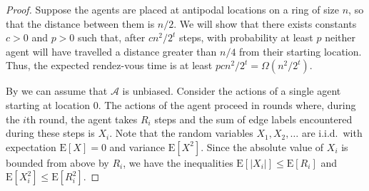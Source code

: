 \documentclass[lotsofwhite]{patmorin}
\newcommand{\E}{\mathrm{E}}
\newcommand{\A}{\mathcal{A}}
\begin{document}
\begin{proof}
Suppose the agents are placed at antipodal locations on a ring of size
$n$,
so that the distance between them is $n/2$.  We will show that there
exists constants $c >0$ and $p> 0$ such that, after $cn^2/2^t$ steps,
with probability at least $p$ neither agent will have travelled a
distance greater than $n/4$ from their starting location.  Thus, the
expected rendez-vous time is at least $p cn^2/2^t = \Omega(n^2/2^t)$.

By  we can assume that $\A$ is unbiased.
Consider the actions of a single agent starting at location 0.  The
actions of the agent proceed in rounds where, during the $i$th round,
the agent takes $R_i$ steps and the sum of edge labels encountered
during these steps is $X_i$.  Note that the random variables
$X_1,X_2,\ldots$ are i.i.d.\ with expectation $\E[X]=0$ and variance
$\E[X^2]$. Since the absolute value of $X_i$ is bounded from above by
$R_i$, we have the inequalities $\E[|X_i|]\le \E[R_i]$ and
$\E[X_i^2]\le\E[R_i^2]$. 


\end{proof}
\end{document}
